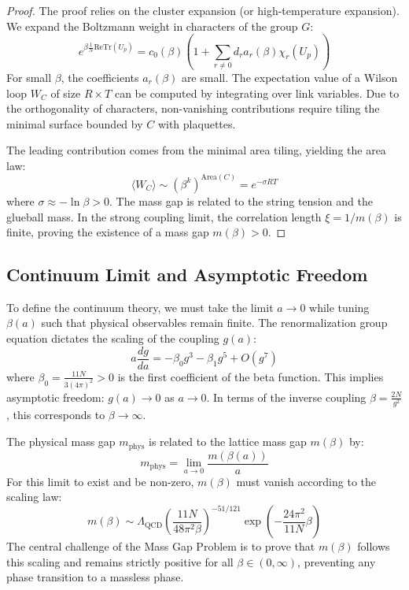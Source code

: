 \begin{proof}
    The proof relies on the cluster expansion (or high-temperature expansion). We expand the Boltzmann weight in characters of the group $G$:
    \begin{equation}
        e^{\beta \frac{1}{N} \text{Re} \text{Tr}(U_p)} = c_0(\beta) \left( 1 + \sum_{r \neq 0} d_r a_r(\beta) \chi_r(U_p) \right)
    \end{equation}
    For small $\beta$, the coefficients $a_r(\beta)$ are small. The expectation value of a Wilson loop $W_C$ of size $R \times T$ can be computed by integrating over link variables. Due to the orthogonality of characters, non-vanishing contributions require tiling the minimal surface bounded by $C$ with plaquettes.
    
    The leading contribution comes from the minimal area tiling, yielding the area law:
    \begin{equation}
        \langle W_C \rangle \sim (\beta^k)^{\text{Area}(C)} = e^{-\sigma R T}
    \end{equation}
    where $\sigma \approx - \ln \beta > 0$. The mass gap is related to the string tension and the glueball mass. In the strong coupling limit, the correlation length $\xi = 1/m(\beta)$ is finite, proving the existence of a mass gap $m(\beta) > 0$.
\end{proof}

\subsection{Continuum Limit and Asymptotic Freedom}

To define the continuum theory, we must take the limit $a \to 0$ while tuning $\beta(a)$ such that physical observables remain finite. The renormalization group equation dictates the scaling of the coupling $g(a)$:
\begin{equation}
    a \frac{dg}{da} = -\beta_0 g^3 - \beta_1 g^5 + O(g^7)
\end{equation}
where $\beta_0 = \frac{11N}{3(4\pi)^2} > 0$ is the first coefficient of the beta function. This implies asymptotic freedom: $g(a) \to 0$ as $a \to 0$.
In terms of the inverse coupling $\beta = \frac{2N}{g^2}$, this corresponds to $\beta \to \infty$.

The physical mass gap $m_{\text{phys}}$ is related to the lattice mass gap $m(\beta)$ by:
\begin{equation}
    m_{\text{phys}} = \lim_{a \to 0} \frac{m(\beta(a))}{a}
\end{equation}
For this limit to exist and be non-zero, $m(\beta)$ must vanish according to the scaling law:
\begin{equation}
    m(\beta) \sim \Lambda_{\text{QCD}} \left( \frac{11N}{48\pi^2 \beta} \right)^{-51/121} \exp\left( -\frac{24\pi^2}{11N} \beta \right)
\end{equation}
The central challenge of the Mass Gap Problem is to prove that $m(\beta)$ follows this scaling and remains strictly positive for all $\beta \in (0, \infty)$, preventing any phase transition to a massless phase.

